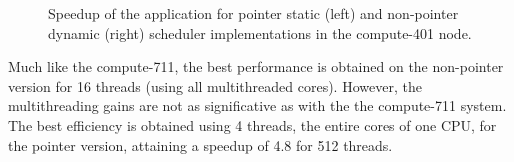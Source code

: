 \begin{figure}[!htp]
	\begin{center}
		\caption{Speedup of the \tth application for pointer static (left) and non-pointer dynamic (right) scheduler implementations in the compute-401 node.}
		\label{fig:Speedup401}
	\end{center}
\end{figure}

Much like the compute-711, the best performance is obtained on the non-pointer version for 16 threads (using all multithreaded cores). However, the multithreading gains are not as significative as with the the compute-711 system. The best efficiency is obtained using 4 threads, the entire cores of one CPU, for the pointer version, attaining a speedup of 4.8 for 512 threads.

